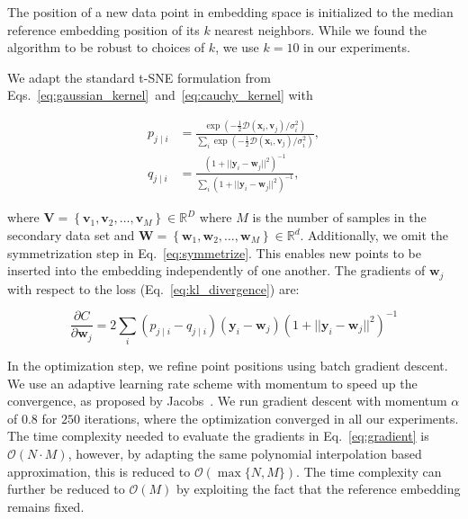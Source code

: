 \documentclass[runningheads]{llncs}
\begin{document}
The position of a new data point in embedding space is initialized to the
median reference embedding position of its $k$ nearest neighbors. While we
found the algorithm to be robust to choices of $k$, we use $k=10$ in our
experiments.

We adapt the standard t-SNE formulation from
Eqs.~\ref{eq:gaussian_kernel}~and~\ref{eq:cauchy_kernel} with

\begin{align}
p_{j \mid i} &= \frac{\exp \left ( -\frac{1}{2} \mathcal{D}(\mathbf{x}_i, \mathbf{v}_j) / \sigma_i^2 \right )}{\sum_{i} \exp \left ( -\frac{1}{2} \mathcal{D}(\mathbf{x}_i, \mathbf{v}_j) / \sigma_i^2 \right )}, \\
q_{j \mid i} &= \frac{\left ( 1 + || \mathbf{y}_i - \mathbf{w}_j ||^2 \right )^{-1}}{\sum_{i}\left ( 1 + || \mathbf{y}_i - \mathbf{w}_j ||^2 \right )^{-1}},
\end{align}

\noindent where $\mathbf{V} = \left \{ \mathbf{v}_1, \mathbf{v}_2, \dots,
\mathbf{v}_M \right \} \in \mathbb{R}^D$ where $M$ is the number of samples in
the secondary data set and $\mathbf{W} = \left \{ \mathbf{w}_1, \mathbf{w}_2, \dots,
\mathbf{w}_M \right \} \in \mathbb{R}^d$. Additionally, we omit the
symmetrization step in Eq.~\ref{eq:symmetrize}. This enables new points to be
inserted into the embedding independently of one another. The gradients of
$\mathbf{w}_j$ with respect to the loss (Eq.~\ref{eq:kl_divergence}) are:

\begin{equation}
\frac{\partial C}{\partial \mathbf{w}_j} = 2 \sum_i \left ( p_{j \mid i} - q_{j \mid i} \right ) \left ( \mathbf{y}_i - \mathbf{w}_j \right ) \left ( 1 + || \mathbf{y}_i - \mathbf{w}_j || ^2 \right )^{-1}
\label{eq:gradient}
\end{equation}

In the optimization step, we refine point positions using batch gradient
descent. We use an adaptive learning rate scheme with momentum to speed up the
convergence, as proposed by Jacobs~\cite{Jacobs1988,Maaten2014}. We run gradient
descent with momentum $\alpha$ of $0.8$ for $250$ iterations, where the
optimization converged in all our experiments. The time complexity needed to
evaluate the gradients in Eq.~\ref{eq:gradient} is $\mathcal{O}(N \cdot M)$,
however, by adapting the same polynomial interpolation based approximation,
this is reduced to $\mathcal{O}(\max \{ N, M \})$. The time complexity can further be
reduced to $\mathcal{O}(M)$ by exploiting the fact that the reference embedding remains fixed.
\end{document}
